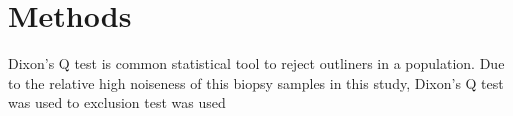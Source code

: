 \chapter{Methods}

Dixon's Q test is common statistical tool to reject outliners in a population. Due to the relative high noiseness of this biopsy samples in this study, Dixon's Q test was used to   exclusion test was used 